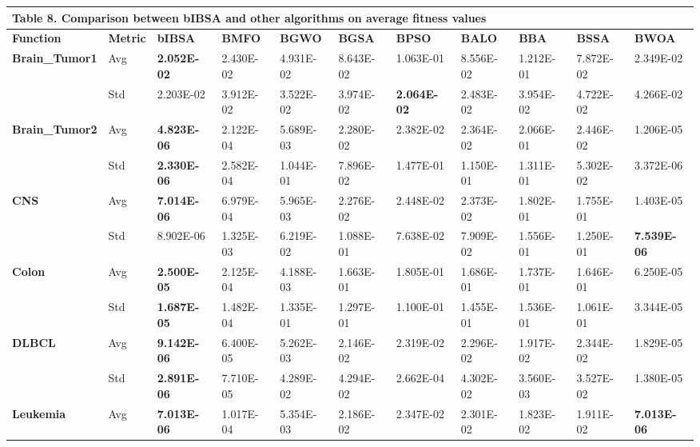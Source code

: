 \documentclass{article} %
\begin{document}
\begin{tabular}{|p{0.6in}|p{0.3in}|p{0.4in}|p{0.4in}|p{0.4in}|p{0.4in}|p{0.4in}|p{0.4in}|p{0.4in}|p{0.4in}|p{0.4in}|} \hline 
\multicolumn{10}{|p{1in}|}{\textbf{Table }8\textbf{. }Comparison between bIBSA and other algorithms on average fitness values\textbf{}} & \textbf{} \\ \hline 
\textbf{Function} & \textbf{Metric} & \textbf{bIBSA} & \textbf{BMFO} & \textbf{BGWO} & \textbf{BGSA} & \textbf{BPSO} & \textbf{BALO} & \textbf{BBA} & \textbf{BSSA} & \textbf{BWOA} \\ \hline 
\textbf{Brain\_Tumor1} & Avg & \textbf{2.052E-02} & 2.430E-02 & 4.931E-02 & 8.643E-02 & 1.063E-01 & 8.556E-02 & 1.212E-01 & 7.872E-02 & 2.349E-02 \\ \hline 
\textbf{} & Std & 2.203E-02\textbf{} & 3.912E-02 & 3.522E-02 & 3.974E-02 & \textbf{2.064E-02} & 2.483E-02 & 3.954E-02 & 4.722E-02 & 4.266E-02 \\ \hline 
\textbf{Brain\_Tumor2} & Avg & \textbf{4.823E-06} & 2.122E-04 & 5.689E-03 & 2.280E-02 & 2.382E-02 & 2.364E-02 & 2.066E-01 & 2.446E-02 & 1.206E-05 \\ \hline 
\textbf{} & Std & \textbf{2.330E-06} & 2.582E-04 & 1.044E-01 & 7.896E-02 & 1.477E-01 & 1.150E-01 & 1.311E-01 & 5.302E-02 & 3.372E-06 \\ \hline 
\textbf{CNS} & Avg & \textbf{7.014E-06} & 6.979E-04 & 5.965E-03 & 2.276E-02 & 2.448E-02 & 2.373E-02 & 1.802E-01 & 1.755E-01 & 1.403E-05 \\ \hline 
\textbf{} & Std & 8.902E-06\textbf{} & 1.325E-03 & 6.219E-02 & 1.088E-01 & 7.638E-02 & 7.909E-02 & 1.556E-01 & 1.250E-01 & \textbf{7.539E-06} \\ \hline 
\textbf{Colon} & Avg & \textbf{2.500E-05} & 2.125E-04 & 4.188E-03 & 1.663E-01 & 1.805E-01 & 1.686E-01 & 1.737E-01 & 1.646E-01 & 6.250E-05 \\ \hline 
\textbf{} & Std & \textbf{1.687E-05} & 1.482E-04 & 1.335E-01 & 1.297E-01 & 1.100E-01 & 1.455E-01 & 1.536E-01 & 1.061E-01 & 3.344E-05 \\ \hline 
\textbf{DLBCL} & Avg & \textbf{9.142E-06} & 6.400E-05\textbf{} & 5.262E-03 & 2.146E-02 & 2.319E-02 & 2.296E-02 & 1.917E-02 & 2.344E-02 & 1.829E-05 \\ \hline 
\textbf{} & Std & \textbf{2.891E-06} & 7.710E-05\textbf{} & 4.289E-02 & 4.294E-02 & 2.662E-04 & 4.302E-02 & 3.560E-03 & 3.527E-02 & 1.380E-05 \\ \hline 
\textbf{Leukemia} & Avg & \textbf{7.013E-06} & 1.017E-04 & 5.354E-03 & 2.186E-02 & 2.347E-02 & 2.301E-02 & 1.823E-02 & 1.911E-02 & \textbf{7.013E-06} \\ \hline 

\end{tabular}
\end{document}
